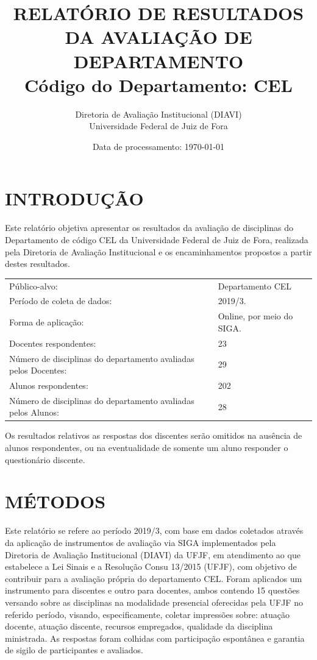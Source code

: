 \documentclass[a4paper,10pt]{article}
\date{Data de processamento: \today}
\begin{document}
\author{Diretoria de Avaliação Institucional (DIAVI) \\ Universidade Federal de Juiz de Fora}

\title{RELATÓRIO DE RESULTADOS DA AVALIAÇÃO DE DEPARTAMENTO\\ Código do Departamento: CEL}
\maketitle
\section{INTRODUÇÃO}
Este relatório objetiva apresentar os resultados da avaliação de disciplinas do Departamento     de código CEL da Universidade Federal de Juiz de Fora, realizada pela     Diretoria de Avaliação Institucional e os encaminhamentos propostos a     partir destes resultados.

\begin{center}
\begin{tabularx}{\linewidth}{X|l}

Público-alvo:& Departamento  CEL\\

Período de coleta de dados:& 2019/3.\\

Forma de aplicação:& Online, por meio do SIGA.\\

Docentes respondentes:& 23\\

Número de disciplinas do departamento avaliadas pelos Docentes:& 29\\

Alunos   respondentes:& 202\\

Número de disciplinas do departamento  avaliadas pelos   Alunos:& 28\\
\end{tabularx}
\end{center}

Os resultados relativos as respostas dos discentes serão omitidos na ausência de alunos respondentes, ou na eventualidade de somente um aluno responder o questionário discente.
\section{MÉTODOS}
Este relatório se refere ao período 2019/3, com base em dados     coletados através da aplicação de instrumentos de avaliação via SIGA     implementados pela Diretoria de Avaliação Institucional (DIAVI) da UFJF, em atendimento     ao que estabelece a Lei Sinais e a Resolução Consu 13/2015 (UFJF),     com objetivo de contribuir para a avaliação própria do departamento CEL.    Foram aplicados um instrumento para discentes e outro para docentes, ambos contendo     15 questões versando sobre as disciplinas na modalidade presencial oferecidas pela UFJF no     referido período, visando, especificamente, coletar impressões sobre: atuação docente, atuação discente,     recursos empregados, qualidade da disciplina ministrada.     As respostas foram colhidas      com participação espontânea e garantia de    sigilo de participantes e avaliados.
\end{document}
